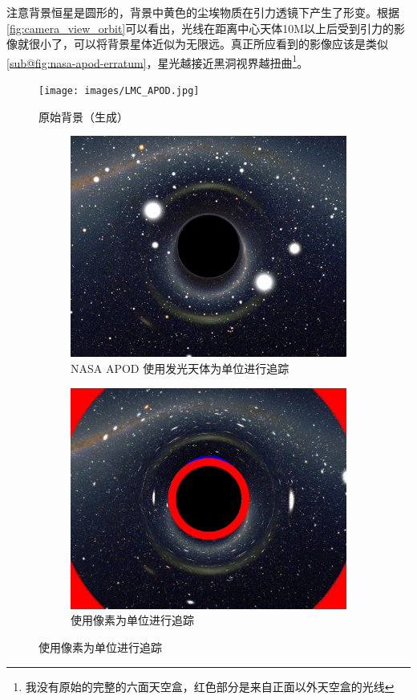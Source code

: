 注意背景恒星是圆形的，背景中黄色的尘埃物质在引力透镜下产生了形变。根据\ref{fig:camera_view_orbit}可以看出，光线在距离中心天体10M以上后受到引力的影像就很小了，可以将背景星体近似为无限远。真正所应看到的影像应该是类似\ref{sub@fig:nasa-apod-erratum}，星光越接近黑洞视界越扭曲\footnote{我没有原始的完整的六面天空盒，红色部分是来自正面以外天空盒的光线}。
\begin{figure}[htbp]
    \centering
    \texttt{[image: images/LMC\_APOD.jpg]}
    \caption{原始背景（生成）}
    \label{fig:lmc_apod} %
\end{figure}
\begin{figure}[htbp]
    \centering
    \begin{subfigure}{.5\textwidth}
        \centering
        \includegraphics[width=.8\linewidth]{images/bhlens_riazuelo.jpg}
        \caption{NASA APOD 使用发光天体为单位进行追踪}
        \label{fig:nasa-apod}
    \end{subfigure}%
    \begin{subfigure}{.5\textwidth}
        \centering
        \includegraphics[width=.8\linewidth]{images/bhlens_erratum.png}
        \caption{使用像素为单位进行追踪}
        \label{fig:nasa-apod-erratum}
    \end{subfigure}
\end{figure}

